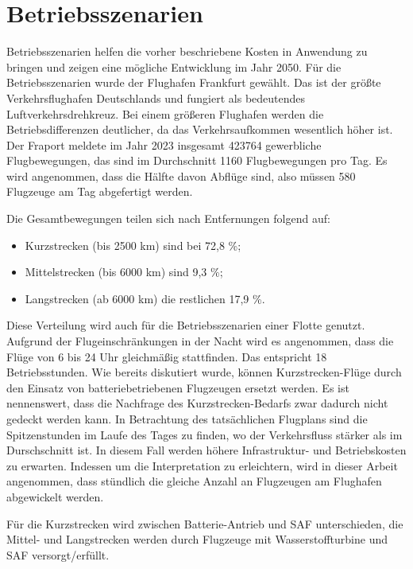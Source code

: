 
\section{Betriebsszenarien}
\label{s:Betriebsszenarien}
Betriebsszenarien helfen die vorher beschriebene Kosten in Anwendung zu bringen und zeigen eine mögliche Entwicklung im Jahr 2050.
Für die Betriebsszenarien wurde der Flughafen Frankfurt gewählt. 
Das ist der größte Verkehrsflughafen Deutschlands und fungiert als bedeutendes Luftverkehrsdrehkreuz. 
Bei einem größeren Flughafen werden die Betriebsdifferenzen deutlicher, da das Verkehrsaufkommen wesentlich höher ist.
Der Fraport meldete im Jahr 2023 insgesamt 423764 gewerbliche Flugbewegungen, das sind im Durchschnitt 1160 Flugbewegungen pro Tag. 
Es wird angenommen, dass die Hälfte davon Abflüge sind, also müssen 580 Flugzeuge am Tag abgefertigt werden.

Die Gesamtbewegungen teilen sich nach Entfernungen folgend auf:
\begin{itemize}
    \item Kurzstrecken (bis 2500 km) sind bei 72,8 \%;
    \item Mittelstrecken (bis 6000 km) sind 9,3 \%;
    \item Langstrecken (ab 6000 km) die restlichen 17,9 \%. 
    \end{itemize}
Diese Verteilung wird auch für die Betriebsszenarien einer Flotte genutzt. 
Aufgrund der Flugeinschränkungen in der Nacht wird es angenommen, dass die Flüge von 6 bis 24 Uhr gleichmäßig stattfinden. 
Das entspricht 18 Betriebsstunden.
Wie bereits diskutiert wurde, können Kurzstrecken-Flüge durch den Einsatz von batteriebetriebenen Flugzeugen ersetzt werden. 
Es ist nennenswert, dass die Nachfrage des Kurzstrecken-Bedarfs zwar dadurch nicht gedeckt werden kann. 
In Betrachtung des tatsächlichen Flugplans sind die Spitzenstunden im Laufe des Tages zu finden, wo
der Verkehrsfluss stärker als im Durschschnitt ist. In diesem Fall werden höhere Infrastruktur- und Betriebskosten zu erwarten.
Indessen um die Interpretation zu erleichtern, wird in dieser Arbeit angenommen, dass stündlich die gleiche Anzahl an Flugzeugen 
am Flughafen abgewickelt werden. 

Für die Kurzstrecken wird zwischen Batterie-Antrieb und SAF unterschieden, 
die Mittel- und Langstrecken werden durch Flugzeuge mit Wasserstoffturbine
und SAF versorgt/erfüllt.

